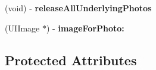 \begin{DoxyCompactItemize}
\item 
\hypertarget{category_i_d_m_photo_browser_07_08_ac0ee4a73191ca00f9000bb7ad7dc7ef9}{}(void) -\/ {\bfseries release\+All\+Underlying\+Photos}\label{category_i_d_m_photo_browser_07_08_ac0ee4a73191ca00f9000bb7ad7dc7ef9}

\item 
\hypertarget{category_i_d_m_photo_browser_07_08_a161969073837294e315b8077f9ce5072}{}(U\+I\+Image $\ast$) -\/ {\bfseries image\+For\+Photo\+:}\label{category_i_d_m_photo_browser_07_08_a161969073837294e315b8077f9ce5072}

\end{DoxyCompactItemize}
\subsection*{Protected Attributes}

